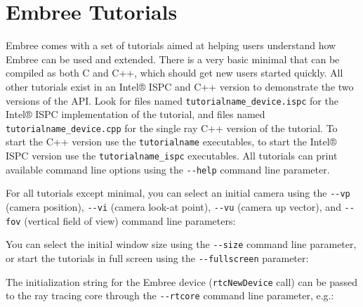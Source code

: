 \chapter{Embree Tutorials}\label{embree-tutorials}

Embree comes with a set of tutorials aimed at helping users understand
how Embree can be used and extended. There is a very basic minimal that
can be compiled as both C and C++, which should get new users started
quickly. All other tutorials exist in an Intel® ISPC and C++ version to
demonstrate the two versions of the API. Look for files named
\texttt{tutorialname\_device.ispc} for the Intel® ISPC implementation of
the tutorial, and files named \texttt{tutorialname\_device.cpp} for the
single ray C++ version of the tutorial. To start the C++ version use the
\texttt{tutorialname} executables, to start the Intel® ISPC version use
the \texttt{tutorialname\_ispc} executables. All tutorials can print
available command line options using the \texttt{-\/-help} command line
parameter.

For all tutorials except minimal, you can select an initial camera using
the \texttt{-\/-vp} (camera position), \texttt{-\/-vi} (camera look-at
point), \texttt{-\/-vu} (camera up vector), and \texttt{-\/-fov}
(vertical field of view) command line parameters:

\begin{Shaded}
\begin{Highlighting}[]
\OperatorTok{{-}{-}}   \OperatorTok{{-}{-}}  
\end{Highlighting}
\end{Shaded}

You can select the initial window size using the \texttt{-\/-size}
command line parameter, or start the tutorials in full screen using the
\texttt{-\/-fullscreen} parameter:

\begin{Shaded}
\begin{Highlighting}[]
\OperatorTok{{-}{-}} 
\OperatorTok{{-}{-}}
\end{Highlighting}
\end{Shaded}

The initialization string for the Embree device (\texttt{rtcNewDevice}
call) can be passed to the ray tracing core through the
\texttt{-\/-rtcore} command line parameter, e.g.:

